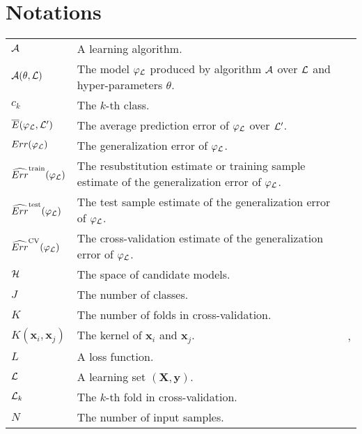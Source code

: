 
\chapter{Notations}

\begin{tabularx}{\textwidth}{ l X l }
${\cal A}$ & A learning algorithm. & \pageref{ntn:A} \\
${\cal A}(\theta, {\cal L})$ & The model $\varphi_{\cal L}$ produced by algorithm ${\cal A}$ over ${\cal L}$ and hyper-parameters $\theta$. & \pageref{ntn:A-func} \\
$c_k$ & The $k$-th class. & \pageref{ntn:c_k} \\
$\overline{E}(\varphi_{\cal L}, {\cal L}^\prime)$ & The average prediction error of $\varphi_{\cal L}$ over ${\cal L}^\prime$. & \pageref{ntn:E_bar} \\
$Err(\varphi_{\cal L})$ & The generalization error of $\varphi_{\cal L}$. & \pageref{ntn:err} \\
$\widehat{Err}^\text{train}(\varphi_{\cal L})$ & The resubstitution estimate or training sample estimate of the generalization error of $\varphi_{\cal L}$. & \pageref{ntn:err-train} \\
$\widehat{Err}^\text{test}(\varphi_{\cal L})$ & The test sample estimate of the generalization error of $\varphi_{\cal L}$. & \pageref{ntn:err-test} \\
$\widehat{Err}^\text{CV}(\varphi_{\cal L})$ & The cross-validation  estimate of the generalization error of $\varphi_{\cal L}$. & \pageref{ntn:err-cv} \\
${\cal H}$ & The space of candidate models. & \pageref{ntn:H} \\
$J$ & The number of classes. & \pageref{ntn:J} \\
$K$ & The number of folds in cross-validation. & \pageref{ntn:K-cv} \\
$K(\mathbf{x}_i, \mathbf{x}_j)$ & The kernel of $\mathbf{x}_i$ and $\mathbf{x}_j$. & \pageref{ntn:kernel}, \pageref{ntn:kernel2} \\
$L$ & A loss function. & \pageref{ntn:L} \\
${\cal L}$ & A learning set $(\mathbf{X}, \mathbf{y})$. & \pageref{ntn:learning-set} \\
${\cal L}_k$ & The $k$-th fold in cross-validation. & \pageref{ntn:L_k} \\
$N$ & The number of input samples. & \pageref{ntn:N} \\

\end{tabularx}

